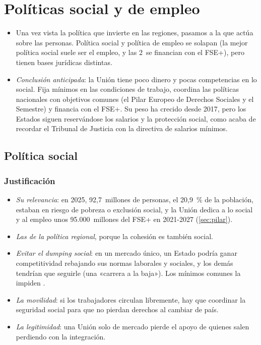 \documentclass[11pt]{article}
\begin{document}
\section{Políticas social y de empleo}\label{sec:social}

\begin{itemize}
\item Una vez vista la política que invierte en las regiones, pasamos a la que actúa sobre las personas. Política social y política de empleo se solapan (la mejor política social suele ser el empleo, y las 2~se financian con el FSE+), pero tienen bases jurídicas distintas.
\item \emph{Conclusión anticipada}: la Unión tiene poco dinero y pocas competencias en lo social. Fija mínimos en las condiciones de trabajo, coordina las políticas nacionales con objetivos comunes (el Pilar Europeo de Derechos Sociales y el Semestre) y financia con el FSE+. Su peso ha crecido desde 2017, pero los Estados siguen reservándose los salarios y la protección social, como acaba de recordar el Tribunal de Justicia con la directiva de salarios mínimos.
\end{itemize}

\subsection{Política social}\label{sec:politica-social}

\subsubsection{Justificación}

\begin{itemize}
\item \emph{Su relevancia}: en 2025, 92,7~millones de personas, el 20,9~\% de la población, estaban en riesgo de pobreza o exclusión social, y la Unión dedica a lo social y al empleo unos 95.000~millones del FSE+ en 2021-2027 (\ref{sec:pilar})\nocite{Eurostat2026AROPE,UE2021FSE}.
\item \emph{Las de la política regional}, porque la cohesión es también social.
\item \emph{Evitar el \emph{dumping} social}: en un mercado único, un Estado podría ganar competitividad rebajando sus normas laborales y sociales, y los demás tendrían que seguirle (una «carrera a la baja»). Los mínimos comunes la impiden .
\item \emph{La movilidad}: si los trabajadores circulan libremente, hay que coordinar la seguridad social para que no pierdan derechos al cambiar de país.
\item \emph{La legitimidad}: una Unión solo de mercado pierde el apoyo de quienes salen perdiendo con la integración.
\end{itemize}
\end{document}
